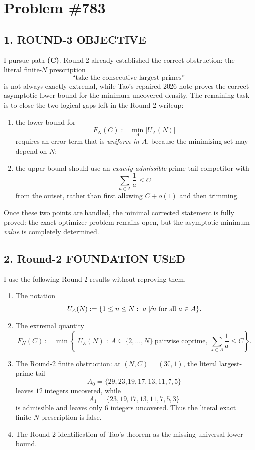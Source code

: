 \section{Problem \#783}

\subsection*{1. ROUND-3 OBJECTIVE}

I pursue path \textbf{(C)}.  Round 2 already established the correct obstruction: the literal finite-\(N\) prescription
\[
\mbox{``take the consecutive largest primes''}
\]
is not always exactly extremal, while Tao's repaired 2026 note proves the correct asymptotic lower bound for the minimum uncovered density.  The remaining task is to close the two logical gaps left in the Round-2 writeup:

\begin{enumerate}
    \item the lower bound for
    \[
    F_N(C):=\min_A |U_A(N)|
    \]
    requires an error term that is \emph{uniform in \(A\)}, because the minimizing set may depend on \(N\);
    \item the upper bound should use an \emph{exactly admissible} prime-tail competitor with
    \[
    \sum_{a\in A}\frac1a\leq C
    \]
    from the outset, rather than first allowing \(C+o(1)\) and then trimming.
\end{enumerate}

Once these two points are handled, the minimal corrected statement is fully proved: the exact optimizer problem remains open, but the asymptotic minimum \emph{value} is completely determined.

\subsection*{2. Round-2 FOUNDATION USED}

I use the following Round-2 results without reproving them.

\begin{enumerate}
    \item The notation
    \[
    U_A(N):=\{1\le n\le N:\ a \not\mid  n \mbox{ for all } a\in A\}.
    \]
    \item The extremal quantity
    \[
    F_N(C):=\min\left\{|U_A(N)|:\ A\subseteq\{2,\dots,N\}\ \mbox{pairwise coprime},\ \sum_{a\in A}\frac1a\le C\right\}.
    \]
    \item The Round-2 finite obstruction: at \((N,C)=(30,1)\), the literal largest-prime tail
    \[
    A_0=\{29,23,19,17,13,11,7,5\}
    \]
    leaves \(12\) integers uncovered, while
    \[
    A_1=\{23,19,17,13,11,7,5,3\}
    \]
    is admissible and leaves only \(6\) integers uncovered.  Thus the literal exact finite-\(N\) prescription is false.
    \item The Round-2 identification of Tao's theorem as the missing universal lower bound.
\end{enumerate}

